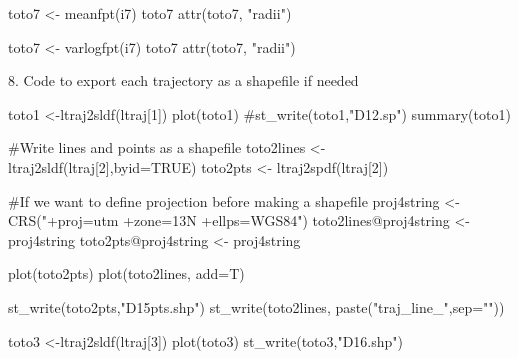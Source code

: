 \documentclass[
  letterpaper,
]{book}
\newenvironment{Shaded}{\begin{snugshade}}{\end{snugshade}}
\newcommand{\AttributeTok}[1]{\textcolor[rgb]{0.40,0.45,0.13}{#1}}
\newcommand{\CommentTok}[1]{\textcolor[rgb]{0.37,0.37,0.37}{#1}}
\newcommand{\ConstantTok}[1]{\textcolor[rgb]{0.56,0.35,0.01}{#1}}
\newcommand{\DecValTok}[1]{\textcolor[rgb]{0.68,0.00,0.00}{#1}}
\newcommand{\FunctionTok}[1]{\textcolor[rgb]{0.28,0.35,0.67}{#1}}
\newcommand{\NormalTok}[1]{\textcolor[rgb]{0.00,0.23,0.31}{#1}}
\newcommand{\OtherTok}[1]{\textcolor[rgb]{0.00,0.23,0.31}{#1}}
\newcommand{\SpecialCharTok}[1]{\textcolor[rgb]{0.37,0.37,0.37}{#1}}
\newcommand{\StringTok}[1]{\textcolor[rgb]{0.13,0.47,0.30}{#1}}
\begin{document}
\begin{Shaded}
\begin{Highlighting}[]
\NormalTok{toto7 }\OtherTok{\textless{}{-}} \FunctionTok{meanfpt}\NormalTok{(i7)}
\NormalTok{toto7}
\FunctionTok{attr}\NormalTok{(toto7, }\StringTok{"radii"}\NormalTok{)}

\NormalTok{toto7 }\OtherTok{\textless{}{-}} \FunctionTok{varlogfpt}\NormalTok{(i7)}
\NormalTok{toto7}
\FunctionTok{attr}\NormalTok{(toto7, }\StringTok{"radii"}\NormalTok{)}
\end{Highlighting}
\end{Shaded}

8. Code to export each trajectory as a shapefile if needed

\begin{Shaded}
\begin{Highlighting}[]
\NormalTok{toto1 }\OtherTok{\textless{}{-}}\FunctionTok{ltraj2sldf}\NormalTok{(ltraj[}\DecValTok{1}\NormalTok{])}
\FunctionTok{plot}\NormalTok{(toto1)}
\CommentTok{\#st\_write(toto1,"D12.sp")}
\FunctionTok{summary}\NormalTok{(toto1)}

\CommentTok{\#Write lines and points as a shapefile}
\NormalTok{toto2lines }\OtherTok{\textless{}{-}}\FunctionTok{ltraj2sldf}\NormalTok{(ltraj[}\DecValTok{2}\NormalTok{],}\AttributeTok{byid=}\ConstantTok{TRUE}\NormalTok{)}
\NormalTok{toto2pts }\OtherTok{\textless{}{-}} \FunctionTok{ltraj2spdf}\NormalTok{(ltraj[}\DecValTok{2}\NormalTok{])}

\CommentTok{\#If we want to define projection before making a shapefile}
\NormalTok{proj4string }\OtherTok{\textless{}{-}} \FunctionTok{CRS}\NormalTok{(}\StringTok{"+proj=utm +zone=13N +ellps=WGS84"}\NormalTok{)}
\NormalTok{toto2lines}\SpecialCharTok{@}\NormalTok{proj4string }\OtherTok{\textless{}{-}}\NormalTok{ proj4string}
\NormalTok{toto2pts}\SpecialCharTok{@}\NormalTok{proj4string }\OtherTok{\textless{}{-}}\NormalTok{ proj4string}

\FunctionTok{plot}\NormalTok{(toto2pts)}
\FunctionTok{plot}\NormalTok{(toto2lines, }\AttributeTok{add=}\NormalTok{T)}

\FunctionTok{st\_write}\NormalTok{(toto2pts,}\StringTok{"D15pts.shp"}\NormalTok{)}
\FunctionTok{st\_write}\NormalTok{(toto2lines, }\FunctionTok{paste}\NormalTok{(}\StringTok{"traj\_line\_"}\NormalTok{,}\AttributeTok{sep=}\StringTok{""}\NormalTok{))}

\NormalTok{toto3 }\OtherTok{\textless{}{-}}\FunctionTok{ltraj2sldf}\NormalTok{(ltraj[}\DecValTok{3}\NormalTok{])}
\FunctionTok{plot}\NormalTok{(toto3)}
\FunctionTok{st\_write}\NormalTok{(toto3,}\StringTok{"D16.shp"}\NormalTok{)}


\end{Highlighting}
\end{Shaded}
\end{document}
